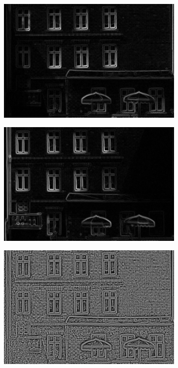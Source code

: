 \documentclass[thesis.tex]{subfiles}
\begin{document}
\begin{figure}[H]
\begin{subfigure}[t]{0.49\textwidth}
        \includegraphics[width=\textwidth]{img/pixelNormalizationExample3.png}
        \caption{}
        \label{fig:pixelNormalizationExample3}
    \end{subfigure}
    \begin{subfigure}[t]{0.49\textwidth}
        \includegraphics[width=\textwidth]{img/pixelNormalizationExample4.png}
        \caption{}
        \label{fig:pixelNormalizationExample4}
    \end{subfigure}
    \begin{subfigure}[t]{0.49\textwidth}
        \includegraphics[width=\textwidth]{img/pixelNormalizationExample5.png}

\end{subfigure}
\end{figure}
\end{document}
